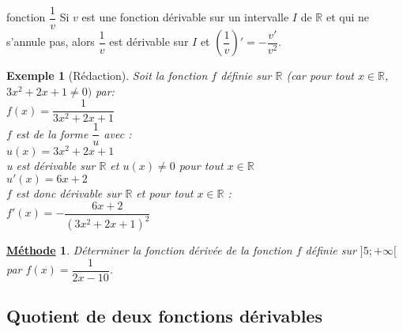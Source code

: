 \documentclass[11pt,a4paper]{article}
\def\R{{\mathbb R}}
\theoremstyle{break}
\newtheorem{Ex}{Exemple}
\newtheorem{Meth}{\underline{Méthode}}
\begin{document}
	\begin{bclogo}[couleur = yellow!30, arrondi = 0.1,logo=\bcbook]{fonction $\dfrac{1}{v}$}
	Si $v$ est une fonction dérivable sur un intervalle $I$ de $\R$ et qui ne s'annule pas, alors $\dfrac{1}{v}$ est dérivable sur $I$ et $\left(\dfrac{1}{v}\right)' =-\dfrac{v'}{v^2}$.
	\end{bclogo}
\begin{Ex}[Rédaction]
	Soit la fonction $f$ définie sur $\R$ (car pour tout $x\in \R$, $3x^2+2x+1\neq0 )$ par:\\
$ f(x) =\dfrac{1}{3x^2+2x+1}$\\
$f$ est de la forme $\dfrac{1}{u}$
avec :\\
$u(x) = 3x^2 + 2x + 1$\\
u est dérivable sur $\R$ et $u(x)\neq 0$ pour tout $x\in\R$\\
$u'(x) = 6x + 2$\\
$f$ est donc dérivable sur $\R$ et pour tout $x\in \R$ :\\
$f'(x) = -\dfrac{6x + 2}{(3x^2 + 2x + 1)^2}$\\
\end{Ex}
\begin{Meth}
	Déterminer la fonction dérivée de la fonction $f$ définie sur $]5;+\infty[$ par $f(x)=\dfrac{1}{2x-10}$.
\end{Meth} 
\subsection{Quotient de deux fonctions dérivables}
\end{document}
